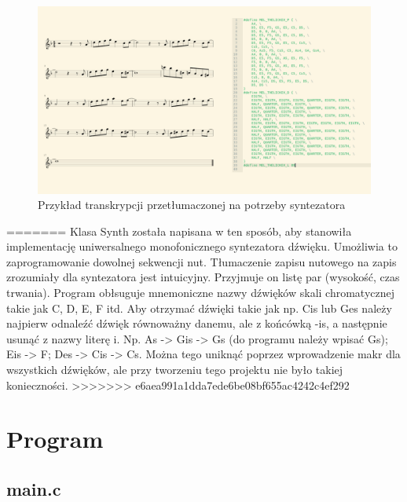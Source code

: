 \documentclass[fleqn]{article}
\begin{document}
\begin{figure}[H]
	\centering
	\includegraphics[width=\textwidth]{assets/synthdata.png}
	\caption{Przykład transkrypcji przetłumaczonej na potrzeby syntezatora}
\end{figure}
=======
Klasa Synth została napisana w ten sposób, aby stanowiła implementację uniwersalnego monofonicznego syntezatora dźwięku. Umożliwia to zaprogramowanie dowolnej sekwencji nut. Tłumaczenie zapisu nutowego na zapis zrozumiały dla syntezatora jest intuicyjny. Przyjmuje on listę par (wysokość, czas trwania). Program obłsuguje mnemoniczne nazwy dźwięków skali chromatycznej takie jak C, D, E, F itd. Aby otrzymać dźwięki takie jak np. Cis lub Ges należy najpierw odnaleźć dźwięk równoważny danemu, ale z końcówką -is, a następnie usunąć z nazwy literę i. Np. As -> Gis -> Gs (do programu należy wpisać Gs); Eis -> F; Des -> Cis -> Cs. Można tego uniknąć poprzez wprowadzenie makr dla wszystkich dźwięków, ale przy tworzeniu tego projektu nie było takiej konieczności.
>>>>>>> e6aea991a1dda7ede6be08bf655ac4242c4ef292

\pagebreak

\section{Program}
\subsection{main.c}

\noindent\begin{minipage}[t]{.45\textwidth}
	
\end{minipage}\hfill
\noindent\begin{minipage}[t]{.45\textwidth}
	
\end{minipage}\hfill
\pagebreak
\end{document}
